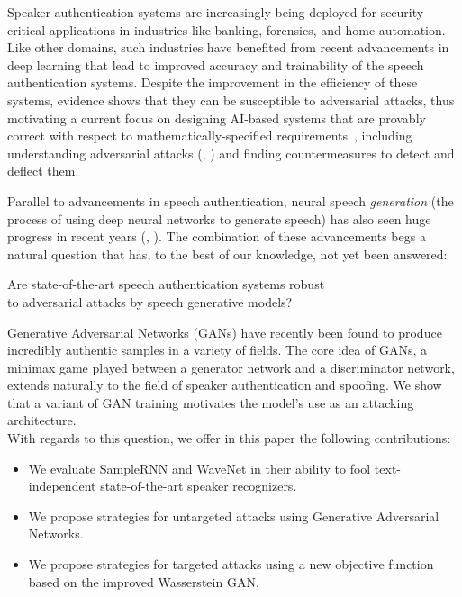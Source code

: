 Speaker authentication systems are increasingly being deployed for security
critical applications in industries like banking, forensics, and home automation. Like
other domains, such industries have benefited from recent advancements in deep
learning that lead to improved accuracy and trainability of the speech authentication systems.
Despite the improvement in the efficiency of these systems, evidence shows that
they can be susceptible to adversarial attacks\cite{wu2015spoofing}, thus motivating a current focus on designing AI-based systems that are provably correct with respect to mathematically-specified requirements~\cite{seshia2016towards}, including understanding adversarial attacks (\cite{szegedy2013intriguing}, \cite{goodfellow2014explaining}) and finding countermeasures to detect and deflect them. 

Parallel to advancements in speech authentication, neural speech \textit{generation} (the process of using deep neural networks to generate speech) has also seen huge progress in recent years (\cite{wang2017tacotron}, \cite{arik2017deep}). 
The combination of these advancements begs a natural question that has, to the
best of our knowledge, not yet been answered:
\begin{center}
Are state-of-the-art speech authentication systems robust \\to adversarial attacks by speech generative models?
\end{center}


Generative Adversarial Networks (GANs) have recently been found to produce incredibly  authentic samples in a variety of fields. The core idea of GANs, a minimax game played between a generator network and a discriminator network, extends naturally to the field of speaker authentication and spoofing. We show that a variant of GAN training motivates the model's use as an attacking architecture.  \\

With regards to this question, we offer in this paper the following contributions:
\begin{itemize}
\item We evaluate SampleRNN and WaveNet in their ability to fool text-independent state-of-the-art speaker recognizers.
\item We propose strategies for untargeted attacks using Generative Adversarial Networks.
\item We propose strategies for targeted attacks using a new objective function based on the improved Wasserstein GAN.
\end{itemize}

